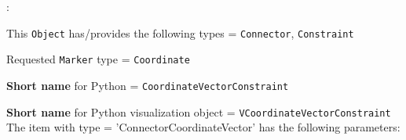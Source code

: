 \noindent {}:
\bi
  \item This \texttt{Object} has/provides the following types = \texttt{Connector}, \texttt{Constraint}
  \item Requested \texttt{Marker} type = \texttt{Coordinate}
  \item {\bf Short name} for Python = \texttt{CoordinateVectorConstraint}
  \item {\bf Short name} for Python visualization object = \texttt{VCoordinateVectorConstraint}
\ei\vspace{12pt} \noindent 
The item  with type = 'ConnectorCoordinateVector' has the following parameters:
\vspace{-0.5cm}\\
\vspace{-0.5cm}\\
